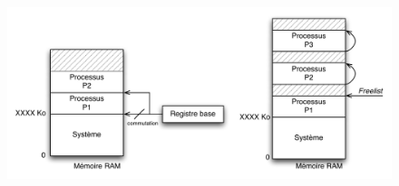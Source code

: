 \documentclass[11pt,english,french]{scrreprt}
\theoremstyle{remark}
\theoremstyle{definition}
\begin{document}
\begin{figure}[h!]
	\center
	\vspace{-20pt}
	\includegraphics[scale=.85]{img/mem-sys}
	\vspace{-10pt}
\end{figure}
\end{document}
